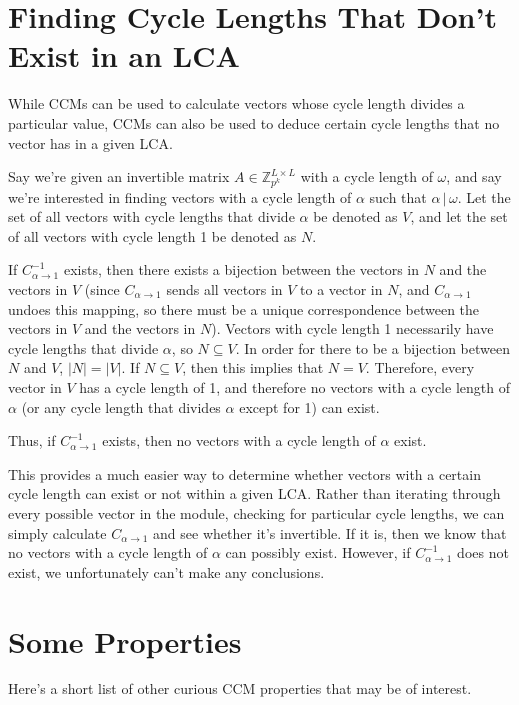 \documentclass[a4paper, 12pt, reqno]{amsart}
\begin{document}
	\section{Finding Cycle Lengths That Don't Exist in an LCA}
	While CCMs can be used to calculate vectors whose cycle length divides a particular value, CCMs can also be used to deduce certain cycle lengths that no vector has in a
	given LCA.
	
	Say we're given an invertible matrix $A \in \mathds{Z}_{p^k}^{L \times L}$ with a cycle length of $\omega$, and say we're interested in finding vectors with a cycle 
	length of $\alpha$ such that $\alpha\,|\,\omega$. Let the set of all vectors with cycle lengths that divide $\alpha$ be denoted as $V$, and let the set of all vectors 
	with cycle length 1 be denoted as $N$.
	
	If $C_{\alpha\rightarrow1}^{-1}$ exists, then there exists a bijection between the vectors in $N$ and the vectors in $V$ (since $C_{\alpha\rightarrow1}$ sends all vectors 
	in $V$ to a vector in $N$, and $C_{\alpha\rightarrow1}$ undoes this mapping, so there must be a unique correspondence between the vectors in $V$ and the vectors in $N$). 
	Vectors with cycle length 1 necessarily have cycle lengths that divide $\alpha$, so $N \subseteq V$. In order for there to be a bijection between $N$ and $V$, 
	$|N| = |V|$. If $N \subseteq V$, then this implies that $N = V$. Therefore, every vector in $V$ has a cycle length of 1, and therefore no vectors with a cycle length of 
	$\alpha$ (or any cycle length that divides $\alpha$ except for 1) can exist.
	
	Thus, if $C_{\alpha\rightarrow1}^{-1}$ exists, then no vectors with a cycle length of $\alpha$ exist.
	
	This provides a much easier way to determine whether vectors with a certain cycle length can exist or not within a given LCA. Rather than iterating through every possible 
	vector in the module, checking for particular cycle lengths, we can simply calculate $C_{\alpha\rightarrow1}$ and see whether it's invertible. If it is, then we know that 
	no vectors with a cycle length of $\alpha$ can possibly exist. However, if $C_{\alpha\rightarrow1}^{-1}$ does not exist, we unfortunately can't make any conclusions.
	
	\section{Some Properties}
	Here's a short list of other curious CCM properties that may be of interest.
	
\end{document}

